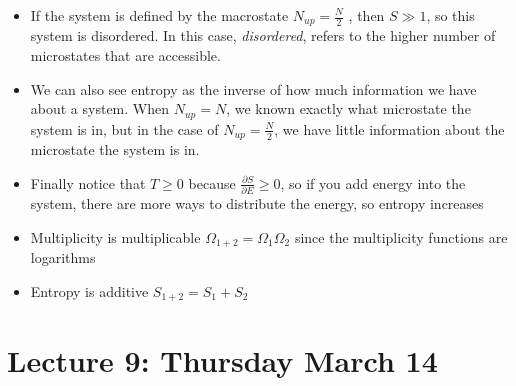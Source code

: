 \documentclass[8pt]{article}
\begin{document}
\begin{itemize}
\begin{itemize}
        \item If the system is defined by the macrostate  $N_{up} = \frac{N}{2}$ , then $S \gg 1$, so this system is disordered. In this case, \textit{disordered}, refers to the higher number of microstates that are accessible. 
        \item We can also see entropy as the inverse of how much information we have about a system. When $N_{up} = N$, we known exactly what microstate the system is in, but in the case of $N_{up} = \frac{N}{2}$, we have little information about the microstate the system is in. 
        \item Finally notice that $T\geq 0$ because $\frac{\partial S}{\partial E} \geq 0$, so if you add energy into the system, there are more ways to distribute the energy, so entropy increases
            \item Multiplicity is multiplicable $\Omega_{1+2} = \Omega_1 \Omega_2$ since the multiplicity functions are logarithms
            \item Entropy is additive $S_{1+2} = S_1 + S_2$

    \end{itemize}
\end{itemize}

\section{Lecture 9: Thursday March 14}
\end{document}

